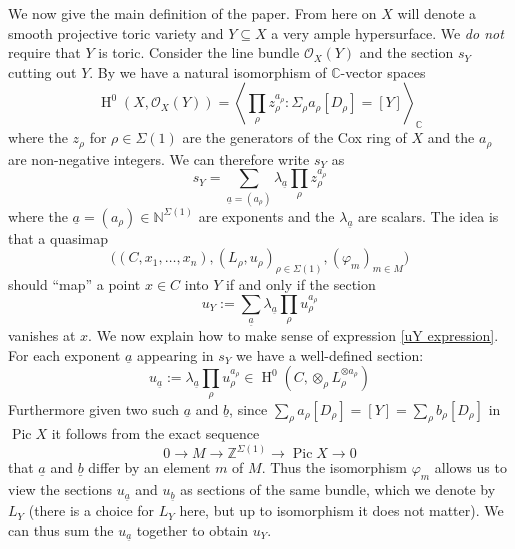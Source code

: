 \documentclass[11pt]{amsart}
\newcommand{\Z}{\mathbb{Z}}
\newcommand{\N}{\mathbb{N}}
\newcommand{\OO}{\mathcal{O}}
\renewcommand{\to}{\rightarrow}
\newcommand{\Pic}{\operatorname{Pic}}
\newcommand{\CC}{\mathbb{C}}
\newcommand{\HH}{\operatorname{H}}
\theoremstyle{definition}
\theoremstyle{definition}
\begin{document}
We now give the main definition of the paper. From here on $X$ will denote a smooth projective toric variety and $Y \subseteq X$ a very ample hypersurface. We \emph{do not} require that $Y$ is toric.
Consider the line bundle $\OO_X(Y)$ and the section $s_Y$ cutting out $Y$. By \cite{CoxRing} we have a natural isomorphism of $\CC$-vector spaces
\begin{equation*} \HH^0(X,\OO_X(Y)) = \left\langle \prod_{\rho} z_\rho^{a_\rho} : \Sigma_\rho a_\rho [D_\rho] = [Y] \right\rangle_{\CC} \end{equation*}
where the $z_\rho$ for $\rho \in \Sigma(1)$ are the generators of the Cox ring of $X$ and the $a_\rho$ are non-negative integers. We can therefore write $s_Y$ as
\begin{equation*} s_Y = \sum_{\underline{a}=(a_\rho)} \lambda_{\underline{a}} \prod_\rho z_\rho^{a_\rho} \end{equation*}
where the $\underline{a} = (a_\rho) \in \N^{\Sigma(1)}$ are exponents and the $\lambda_{\underline{a}}$ are scalars. The idea is that a quasimap
\begin{equation*} \big((C,x_1,\ldots,x_n), (L_\rho,u_\rho)_{\rho \in \Sigma(1)}, (\varphi_m)_{m \in M}\big) \end{equation*}
should ``map'' a point $x \in C$ into $Y$ if and only if the section
\begin{equation} \label{uY expression} u_Y := \sum_{\underline{a}} \lambda_{\underline{a}} \prod_\rho u_\rho^{a_\rho} \end{equation}
vanishes at $x$. We now explain how to make sense of expression \eqref{uY expression}. For each exponent $\underline{a}$ appearing in $s_Y$ we have a well-defined section:
\begin{equation*} u_{\underline{a}} := \lambda_{\underline{a}} \prod_\rho u_\rho^{a_\rho} \in \HH^0(C,\otimes_\rho L_\rho^{\otimes a_\rho}) \end{equation*}
Furthermore given two such $\underline{a}$ and $\underline{b}$, since $\sum_\rho a_\rho [D_\rho] = [Y] = \sum_\rho b_\rho [D_\rho]$ in $\Pic{X}$ it follows from the exact sequence
\begin{equation*} 0 \to M \to \Z^{\Sigma(1)} \to \Pic{X} \to 0 \end{equation*}
that $\underline{a}$ and $\underline{b}$ differ by an element $m$ of $M$. Thus the isomorphism $\varphi_m$ allows us to view the sections $u_{\underline{a}}$ and $u_{\underline{b}}$ as sections of the same bundle, which we denote by $L_Y$ (there is a choice for $L_Y$ here, but up to isomorphism it does not matter). We can thus sum the $u_{\underline{a}}$ together to obtain $u_Y$.
\end{document}
